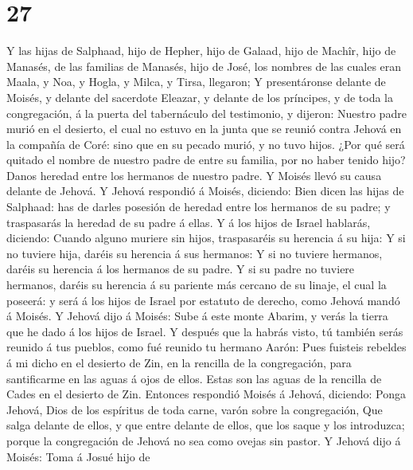 \hypertarget{section-26}{%
\section{27}\label{section-26}}

 Y las hijas de Salphaad, hijo de Hepher, hijo de Galaad,
hijo de Machîr, hijo de Manasés, de las familias de Manasés, hijo de
José, los nombres de las cuales eran Maala, y Noa, y Hogla, y Milca, y
Tirsa, llegaron;  Y presentáronse delante de Moisés, y
delante del sacerdote Eleazar, y delante de los príncipes, y de toda la
congregación, á la puerta del tabernáculo del testimonio, y dijeron:
 Nuestro padre murió en el desierto, el cual no estuvo en
la junta que se reunió contra Jehová en la compañía de Coré: sino que en
su pecado murió, y no tuvo hijos.  ¿Por qué será quitado
el nombre de nuestro padre de entre su familia, por no haber tenido
hijo? Danos heredad entre los hermanos de nuestro padre. 
Y Moisés llevó su causa delante de Jehová.  Y Jehová
respondió á Moisés, diciendo:  Bien dicen las hijas de
Salphaad: has de darles posesión de heredad entre los hermanos de su
padre; y traspasarás la heredad de su padre á ellas.  Y á
los hijos de Israel hablarás, diciendo: Cuando alguno muriere sin hijos,
traspasaréis su herencia á su hija:  Y si no tuviere hija,
daréis su herencia á sus hermanos:  Y si no tuviere
hermanos, daréis su herencia á los hermanos de su padre. 
Y si su padre no tuviere hermanos, daréis su herencia á su pariente más
cercano de su linaje, el cual la poseerá: y será á los hijos de Israel
por estatuto de derecho, como Jehová mandó á Moisés.  Y
Jehová dijo á Moisés: Sube á este monte Abarim, y verás la tierra que he
dado á los hijos de Israel.  Y después que la habrás
visto, tú también serás reunido á tus pueblos, como fué reunido tu
hermano Aarón:  Pues fuisteis rebeldes á mi dicho en el
desierto de Zin, en la rencilla de la congregación, para santificarme en
las aguas á ojos de ellos. Estas son las aguas de la rencilla de Cades
en el desierto de Zin.  Entonces respondió Moisés á
Jehová, diciendo:  Ponga Jehová, Dios de los espíritus de
toda carne, varón sobre la congregación,  Que salga
delante de ellos, y que entre delante de ellos, que los saque y los
introduzca; porque la congregación de Jehová no sea como ovejas sin
pastor.  Y Jehová dijo á Moisés: Toma á Josué hijo de
